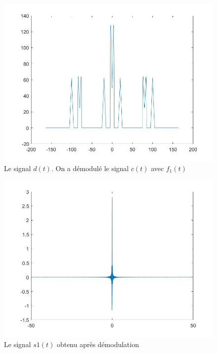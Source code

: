 \documentclass[10pt,a4paper]{article}
\begin{document}
\begin{figure}	\begin{center}
\includegraphics[scale=0.35]{Signal_d.jpg}
\caption{Le signal $d(t)$. On a démodulé le signal $c(t)$ avec $f_1(t)$}
\label{d}
\end{center}	\end{figure}

\begin{figure}	\begin{center}
\includegraphics[scale=0.35]{s1_demodule.jpg}
\caption{Le signal $s1(t)$  obtenu après démodulation}
\label{s1demod}
\end{center}	\end{figure}
\end{document}

